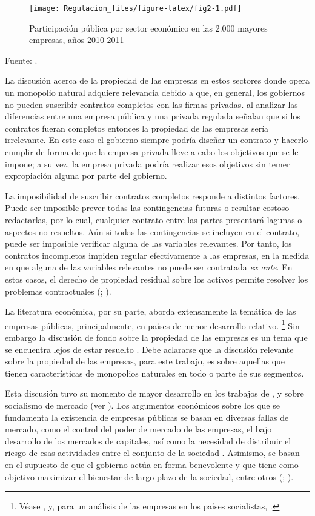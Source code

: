 \documentclass[
  12pt,
  spanish,
]{book}
\begin{document}
\begin{figure}
\centering
\texttt{[image: Regulacion\_files/figure-latex/fig2-1.pdf]}
\caption{\label{fig:fig2}Participación pública por sector económico en las 2.000 mayores empresas, años 2010-2011}
\end{figure}

Fuente: \citet{Kowalski2013}.

La discusión acerca de la propiedad de las empresas en estos sectores donde opera un monopolio natural adquiere relevancia debido a que, en general, los gobiernos no pueden suscribir contratos completos con las firmas privadas. \citet{Laffont1993} al analizar las diferencias entre una empresa pública y una privada regulada señalan que si los contratos fueran completos entonces la propiedad de las empresas sería irrelevante. En este caso el gobierno siempre podría diseñar un contrato y hacerlo cumplir de forma de que la empresa privada lleve a cabo los objetivos que se le impone; a su vez, la empresa privada podría realizar esos objetivos sin temer expropiación alguna por parte del gobierno.

La imposibilidad de suscribir contratos completos responde a distintos factores. Puede ser imposible prever todas las contingencias futuras o resultar costoso redactarlas, por lo cual, cualquier contrato entre las partes presentará lagunas o aspectos no resueltos. Aún si todas las contingencias se incluyen en el contrato, puede ser imposible verificar alguna de las variables relevantes. Por tanto, los contratos incompletos impiden regular efectivamente a las empresas, en la medida en que alguna de las variables relevantes no puede ser contratada \emph{ex ante}. En estos casos, el derecho de propiedad residual sobre los activos permite resolver los problemas contractuales (\citet{Hart1995}; \citet{Perotti2004}).

La literatura económica, por su parte, aborda extensamente la temática de las empresas públicas, principalmente, en países de menor desarrollo relativo.
\footnote{Véase \citet{Jones1982}, \citet{WorldBank1995} y, para un análisis de las empresas en los países socialistas, \citet{Roland2000}.}
Sin embargo la discusión de fondo sobre la propiedad de las empresas es un tema que se encuentra lejos de estar resuelto \citep{Hart2003}. Debe aclararse que la discusión relevante sobre la propiedad de las empresas, para este trabajo, es sobre aquellas que tienen características de monopolios naturales en todo o parte de sus segmentos.

Esta discusión tuvo su momento de mayor desarrollo en los trabajos de \citet{Lange1936}, \citet{Lange1937} y \citet{Lerner1944} sobre socialismo de mercado (ver \citet{Coloma2004}). Los argumentos económicos sobre los que se fundamenta la existencia de empresas públicas se basan en diversas fallas de mercado, como el control del poder de mercado de las empresas, el bajo desarrollo de los mercados de capitales, así como la necesidad de distribuir el riesgo de esas actividades entre el conjunto de la sociedad \citep{Sappington1987}. Asimismo, se basan en el supuesto de que el gobierno actúa en forma benevolente y que tiene como objetivo maximizar el bienestar de largo plazo de la sociedad, entre otros (\citet{Dixit1997}; \citet{Martimort2006}).
\end{document}
